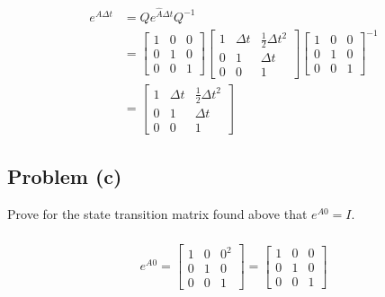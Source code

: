 \documentclass[11pt]{article}
\begin{document}
\begin{align*}
	e^{A\Delta t} &= Qe^{\hat{A}\Delta t}Q^{-1} \\
	&= \begin{bmatrix} 1 & 0 & 0 \\ 0 & 1 & 0 \\ 0 & 0 & 1 \end{bmatrix} \begin{bmatrix} 1 & \Delta t & \frac{1}{2} \Delta t^2 \\ 0 & 1 & \Delta t \\ 0 & 0 & 1 \end{bmatrix} \begin{bmatrix} 1 & 0 & 0 \\ 0 & 1 & 0 \\ 0 & 0 & 1 \end{bmatrix}^{-1} \\
	&= \begin{bmatrix} 1 & \Delta t & \frac{1}{2}\Delta t^2 \\
					   0 & 1 & \Delta t \\
					   0 & 0 & 1 \end{bmatrix}
\end{align*}

\subsection*{Problem (c)}
Prove for the state transition matrix found above that $e^{A0} = I$.

\subparagraph*{} 
\begin{equation*}
	e^{A0} = \begin{bmatrix} 1 & 0 & 0^2 \\
							 0 & 1 & 0 \\
							 0 & 0 & 1 \end{bmatrix}
			= \begin{bmatrix} 1 & 0 & 0 \\
							  0 & 1 & 0 \\
							  0 & 0 & 1 \end{bmatrix}
\end{equation*}
\end{document}
